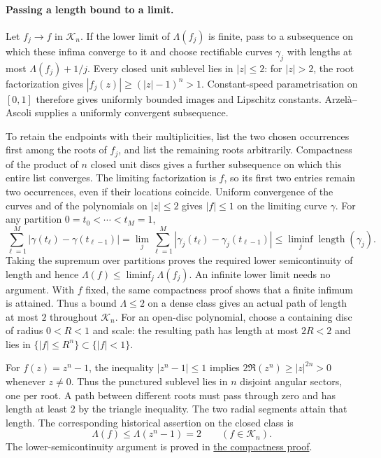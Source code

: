 \documentclass[11pt]{article}
\begin{document}
\paragraph{Passing a length bound to a limit.}
Let $f_j\to f$ in $\mathcal K_n$. If the lower limit of
$\Lambda(f_j)$ is finite, pass to a subsequence on which these infima
converge to it and choose rectifiable curves $\gamma_j$ with lengths at
most $\Lambda(f_j)+1/j$. Every closed unit sublevel lies in $|z|\le2$:
for $|z|>2$, the root factorization gives
$|f_j(z)|\ge(|z|-1)^n>1$. Constant-speed parametrisation on $[0,1]$
therefore gives uniformly bounded images and Lipschitz constants.
Arzel\`a--Ascoli supplies a uniformly convergent subsequence.

To retain the endpoints with their multiplicities, list the two chosen
occurrences first among the roots of $f_j$, and list the remaining roots
arbitrarily. Compactness of the product of $n$ closed unit discs gives a
further subsequence on which this entire list converges. The limiting
factorization is $f$, so its first two entries remain two occurrences,
even if their locations coincide. Uniform convergence of the curves and
of the polynomials on $|z|\le2$ gives $|f|\le1$ on the limiting curve
$\gamma$. For any partition $0=t_0<\cdots<t_M=1$,
\[
 \sum_{\ell=1}^M|\gamma(t_\ell)-\gamma(t_{\ell-1})|
 =\lim_j\sum_{\ell=1}^M|\gamma_j(t_\ell)-\gamma_j(t_{\ell-1})|
 \le\liminf_j\operatorname{length}(\gamma_j).
\]
Taking the supremum over partitions proves the required lower
semicontinuity of length and hence
$\Lambda(f)\le\liminf_j\Lambda(f_j)$. An infinite lower limit needs no
argument. With $f$ fixed, the same compactness proof shows that a finite
infimum is attained. Thus a bound $\Lambda\le2$ on a dense class gives
an actual path of length at most $2$ throughout $\mathcal K_n$.
For an open-disc polynomial, choose a containing disc of radius
$0<R<1$ and scale: the resulting path has length at most $2R<2$ and
lies in $\{|f|\le R^n\}\subset\{|f|<1\}$.

For $f(z)=z^n-1$, the inequality $|z^n-1|\le1$ implies
$2\Re(z^n)\ge|z|^{2n}>0$ whenever $z\ne0$. Thus the punctured sublevel
lies in $n$ disjoint angular sectors, one per root. A path between
different roots must pass through zero and has length at least $2$ by
the triangle inequality. The two radial segments attain that length.  The corresponding historical assertion on the closed class is
\[
 \boxed{\Lambda(f)\le\Lambda(z^n-1)=2\qquad(f\in\mathcal K_n).}
\]
The lower-semicontinuity argument is proved in
\href{https://github.com/wcook04/plectis-erdos/blob/f36a98bf3d3e6f65f1074e3b800e3293d5b8a51a/ErdosProblems/Erdos1041/GenericSufficiencyClosure.md}{the compactness proof}.
\end{document}
